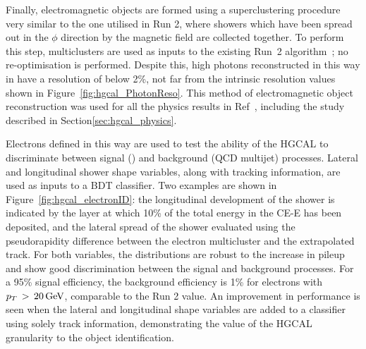 Finally, electromagnetic objects are formed using a superclustering procedure very similar to the one utilised in Run 2, 
where showers which have been spread out in the $\phi$ direction by the magnetic field are collected together.
To perform this step, multiclusters are used as inputs to the existing Run~2 algorithm~\cite{PhotonReco}; no re-optimisation is performed.
Despite this, high \pt photons reconstructed in this way in have a resolution of below 2\%, 
not far from the intrinsic resolution values shown in Figure~\ref{fig:hgcal_PhotonReso}.
This method of electromagnetic object reconstruction was used for all the physics results in Ref~\cite{HGCAL}, 
including the study described in Section\ref{sec:hgcal_physics}.

Electrons defined in this way are used to test the ability of the HGCAL 
to discriminate between signal (\Zee) and background (QCD multijet) processes. 
Lateral and longitudinal shower shape variables, 
along with tracking information, are used as inputs to a BDT classifier. 
Two examples are shown in Figure~\ref{fig:hgcal_electronID}: 
the longitudinal development of the shower is indicated by the layer 
at which 10\% of the total energy in the CE-E has been deposited, 
and the lateral spread of the shower evaluated using the pseudorapidity difference 
between the electron multicluster and the extrapolated track.
For both variables, the distributions are robust to the increase in pileup 
and show good discrimination between the signal and background processes.
For a 95\% signal efficiency, the background efficiency is 1\% 
for electrons with $p_T\,>\,\SI{20}{GeV}$, comparable to the Run 2 value. %
An improvement in performance is seen when the lateral and longitudinal shape variables 
are added to a classifier using solely track information, 
demonstrating the value of the HGCAL granularity to the object identification.

